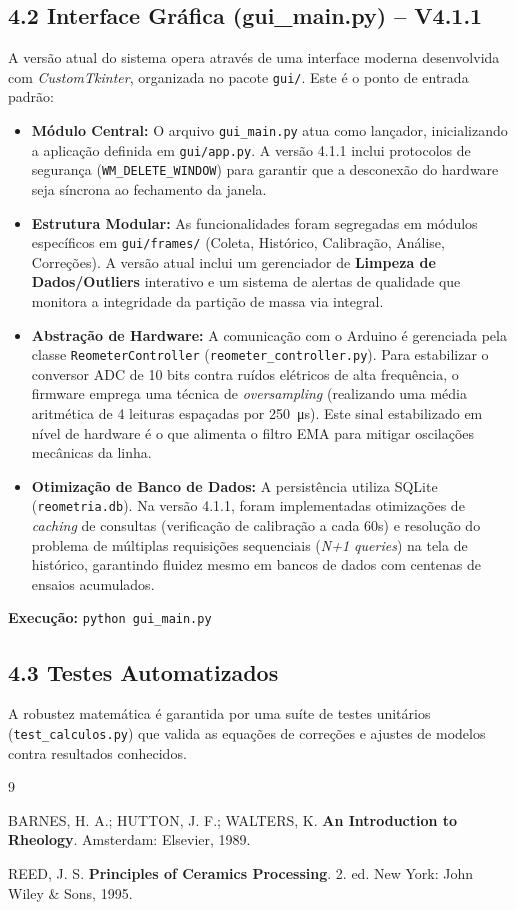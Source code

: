 \documentclass[a4paper,12pt]{article}
\begin{document}
\subsection*{4.2 Interface Gráfica (gui\_main.py) -- V4.1.1}
A versão atual do sistema opera através de uma interface moderna desenvolvida com \textit{CustomTkinter}, organizada no pacote \texttt{gui/}. Este é o ponto de entrada padrão:

\begin{itemize}
  \item \textbf{Módulo Central:} O arquivo \texttt{gui\_main.py} atua como lançador, inicializando a aplicação definida em \texttt{gui/app.py}. A versão 4.1.1 inclui protocolos de segurança (\texttt{WM\_DELETE\_WINDOW}) para garantir que a desconexão do hardware seja síncrona ao fechamento da janela.
  \item \textbf{Estrutura Modular:} As funcionalidades foram segregadas em módulos específicos em \texttt{gui/frames/} (Coleta, Histórico, Calibração, Análise, Correções). A versão atual inclui um gerenciador de \textbf{Limpeza de Dados/Outliers} interativo e um sistema de alertas de qualidade que monitora a integridade da partição de massa via integral.
  \item \textbf{Abstração de Hardware:} A comunicação com o Arduino é gerenciada pela classe \texttt{ReometerController} (\texttt{reometer\_controller.py}). Para estabilizar o conversor ADC de 10 bits contra ruídos elétricos de alta frequência, o firmware emprega uma técnica de \textit{oversampling} (realizando uma média aritmética de 4 leituras espaçadas por \SI{250}{\micro s}). Este sinal estabilizado em nível de hardware é o que alimenta o filtro EMA para mitigar oscilações mecânicas da linha.
  \item \textbf{Otimização de Banco de Dados:} A persistência utiliza SQLite (\texttt{reometria.db}). Na versão 4.1.1, foram implementadas otimizações de \textit{caching} de consultas (verificação de calibração a cada 60s) e resolução do problema de múltiplas requisições sequenciais (\textit{N+1 queries}) na tela de histórico, garantindo fluidez mesmo em bancos de dados com centenas de ensaios acumulados.
\end{itemize}

\textbf{Execução:} \texttt{python gui\_main.py}

\subsection*{4.3 Testes Automatizados}
A robustez matemática é garantida por uma suíte de testes unitários (\texttt{test\_calculos.py}) que valida as equações de correções e ajustes de modelos contra resultados conhecidos.

\begin{thebibliography}{9}

BARNES, H. A.; HUTTON, J. F.; WALTERS, K. \textbf{An Introduction to Rheology}. Amsterdam: Elsevier, 1989.

REED, J. S. \textbf{Principles of Ceramics Processing}. 2. ed. New York: John Wiley \& Sons, 1995.

\end{thebibliography}
\end{document}
